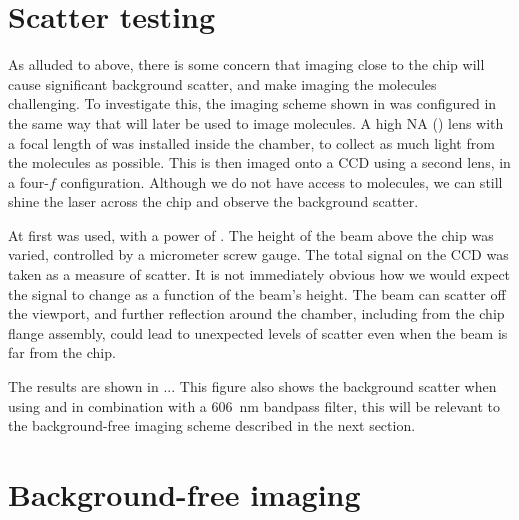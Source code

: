 \section{Scatter testing}
\label{exper:scatter}

As alluded to above, there is some concern that imaging close to the chip will
cause significant background scatter, and make imaging the molecules
challenging. To investigate this, the imaging scheme shown in
 was configured in the same way that will later
be used to image molecules.  A high NA () lens with a focal length of
 was installed inside the chamber, to collect as much light from the
molecules as possible. This is then imaged onto a CCD using a second 
lens, in a four-$f$ configuration. Although we do not have access to molecules,
we can still shine the laser across the chip and observe the background
scatter.

At first  was used, with a power of .  The height of the
beam above the chip was varied, controlled by a micrometer screw gauge. The
total signal on the CCD was taken as a measure of scatter. It is not
immediately obvious how we would expect the signal to change as a function of
the beam's height. The beam can scatter off the viewport, and further
reflection around the chamber, including from the chip flange assembly, could
lead to unexpected levels of scatter even when the beam is far from the chip.

The results are shown in ...
%
This figure also shows the background scatter when using  and
 in combination with a \SI{606}{\nano\meter} bandpass filter, this
will be relevant to the background-free imaging scheme described in the next
section.

\begin{figure}
  \caption{}
  \label{exper:fig:scatter}
\end{figure}

\section{Background-free imaging}
\label{exper:bgf}


